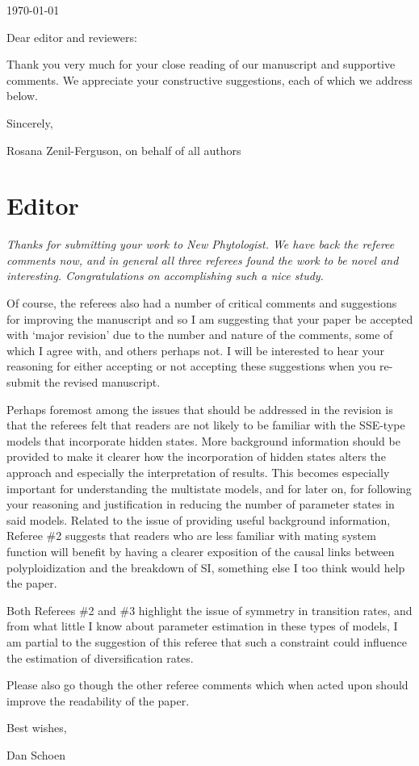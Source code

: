 \documentclass[11pt]{article}
\renewenvironment{quote}{\bigskip\noindent\itshape\ignorespaces}{\smallskip}
\begin{document}
\hfill \today

Dear editor and reviewers:

\medskip
Thank you very much for your close reading of our manuscript and supportive comments.
We appreciate your constructive suggestions, each of which we address below.

\medskip
Sincerely,

Rosana Zenil-Ferguson, on behalf of all authors


\section{Editor}
\vspace{-11pt}

\begin{quote}
Thanks for submitting your work to New Phytologist.
We have back the referee comments now, and in general all three referees found the work to be novel and interesting.
Congratulations on accomplishing such a nice study.

Of course, the referees also had a number of critical comments and suggestions for improving the manuscript and so I am suggesting that your paper be accepted with `major revision' due to the number and nature of the comments, some of which I agree with, and others perhaps not.
I will be interested to hear your reasoning for either accepting or not accepting these suggestions when you re-submit the revised manuscript.

Perhaps foremost among the issues that should be addressed in the revision is that the referees felt that readers are not likely to be familiar with the SSE-type models that incorporate hidden states.
More background information should be provided to make it clearer how the incorporation of hidden states alters the approach and especially the interpretation of results.
This becomes especially important for understanding the multistate models, and for later on, for following your reasoning and justification in reducing the number of parameter states in said models.
Related to the issue of providing useful background information, Referee \#2 suggests that readers who are less familiar with mating system function will benefit by having a clearer exposition of the causal links between polyploidization and the breakdown of SI, something else I too think would help the paper.

Both Referees \#2 and \#3 highlight the issue of symmetry in transition rates, and from what little I know about parameter estimation in these types of models, I am partial to the suggestion of this referee that such a constraint could influence the estimation of diversification rates.

Please also go though the other referee comments which when acted upon should improve the readability of the paper.

Best wishes,

Dan Schoen
\end{quote}
\end{document}
